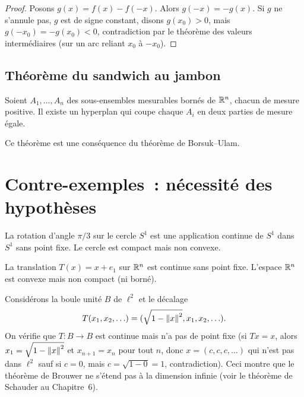\begin{proof}
Posons $g(x) = f(x) - f(-x)$. Alors $g(-x) = -g(x)$. Si $g$ ne s'annule pas,
$g$ est de signe constant, disons $g(x_0) > 0$, mais $g(-x_0) = -g(x_0) < 0$,
contradiction par le th\'eor\`eme des valeurs interm\'ediaires (sur un arc reliant
$x_0$ \`a $-x_0$).
\end{proof}

\subsection{Th\'eor\`eme du sandwich au jambon}

\begin{theoreme}
Soient $A_1, \ldots, A_n$ des sous-ensembles mesurables born\'es de $\mathbb{R}^n$, chacun
de mesure positive. Il existe un hyperplan qui coupe chaque $A_i$ en deux parties
de mesure \'egale.
\end{theoreme}

\begin{remarque}
Ce th\'eor\`eme est une cons\'equence du th\'eor\`eme de Borsuk--Ulam.
\end{remarque}

\section{Contre-exemples~: n\'ecessit\'e des hypoth\`eses}

\begin{exemple}
La rotation d'angle $\pi/3$ sur le cercle $S^1$ est une application continue
de $S^1$ dans $S^1$ sans point fixe. Le cercle est compact mais non convexe.
\end{exemple}

\begin{exemple}
La translation $T(x) = x + e_1$ sur $\mathbb{R}^n$ est continue sans point fixe.
L'espace $\mathbb{R}^n$ est convexe mais non compact (ni born\'e).
\end{exemple}

\begin{exemple}
Consid\'erons la boule unit\'e $B$ de $\ell^2$ et le d\'ecalage
\[
    T(x_1, x_2, \ldots) = (\sqrt{1 - \left\| x \right\|^2}, x_1, x_2, \ldots).
\]
On v\'erifie que $T : B \to B$ est continue mais n'a pas de point fixe (si
$Tx = x$, alors $x_1 = \sqrt{1 - \left\| x \right\|^2}$ et $x_{n+1} = x_n$ pour tout $n$,
donc $x = (c, c, c, \ldots)$ qui n'est pas dans $\ell^2$ sauf si $c = 0$, mais
$c = \sqrt{1 - 0} = 1$, contradiction). Ceci montre que le th\'eor\`eme de
Brouwer ne s'\'etend pas \`a la dimension infinie (voir le th\'eor\`eme de Schauder
au Chapitre~6).
\end{exemple}

